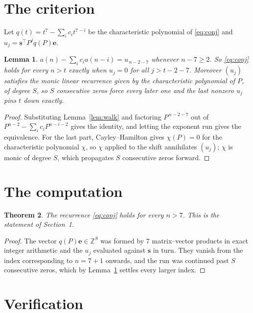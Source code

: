 \documentclass[11pt,a4paper]{article}
\theoremstyle{plain}
\newtheorem{theorem}{Theorem}
\newtheorem{lemma}[theorem]{Lemma}
\theoremstyle{definition}
\begin{document}
\section{The criterion}

Let $q(t)=t^{7}-\sum_i c_i t^{7-i}$ be the characteristic polynomial of
\eqref{eq:conj} and $u_j=\mathbf{s}^{\!\top}P^{j}q(P)\mathbf{e}$.

\begin{lemma}\label{lem:crit}
$a(n)-\sum_i c_i a(n-i)=u_{\,n-2-7}$ whenever $n-7\ge2$. So \eqref{eq:conj}
holds for every $n>t$ exactly when $u_j=0$ for all $j>t-2-7$. Moreover $(u_j)$
satisfies the monic linear recurrence given by the characteristic polynomial of $P$, of
degree $S$, so $S$ consecutive zeros force every later one and the last nonzero $u_j$ pins
$t$ down exactly.
\end{lemma}

\begin{proof}
Substituting Lemma~\ref{lem:walk} and factoring $P^{\,n-2-7}$ out of
$P^{n-2}-\sum_i c_i P^{n-i-2}$ gives the identity, and letting the exponent run gives the
equivalence. For the last part, Cayley--Hamilton gives $\chi(P)=0$ for the characteristic
polynomial $\chi$, so $\chi$ applied to the shift annihilates $(u_j)$; $\chi$ is monic of
degree $S$, which propagates $S$ consecutive zeros forward.
\end{proof}

\section{The computation}

\begin{theorem}
The recurrence \eqref{eq:conj} holds for every $n>7$. This is the statement of
Section~1.
\end{theorem}

\begin{proof}
The vector $q(P)\mathbf{e}\in\mathbb{Z}^{S}$ was formed by $7$ matrix--vector
products in exact integer arithmetic and the $u_j$ evaluated against $\mathbf{s}$ in turn.
They vanish from the index corresponding to $n=7+1$ onwards, and the run was continued
past $S$ consecutive zeros, which by Lemma~\ref{lem:crit} settles every larger index.
\end{proof}

\section{Verification}
\end{document}

